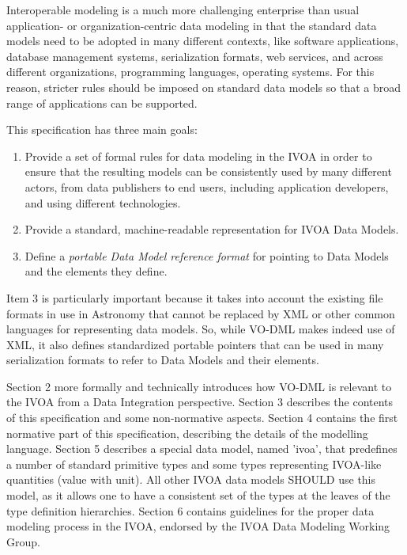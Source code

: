 \documentclass[10pt,a4paper]{ivoa}
\begin{document}
Interoperable modeling is a much more challenging enterprise than usual
application- or organization-centric data modeling in that the standard
data models need to be adopted in many different contexts, like software
applications, database management systems, serialization formats, web
services, and across different organizations, programming languages,
operating systems. For this reason, stricter rules should be imposed on
standard data models so that a broad range of applications can be
supported.

This specification has three main goals:

\begin{enumerate}
\def\labelenumi{\arabic{enumi}.}
\item
  Provide a set of formal rules for data modeling in the IVOA in order
  to ensure that the resulting models can be consistently used by many
  different actors, from data publishers to end users, including
  application developers, and using different technologies.
\item
  Provide a standard, machine-readable representation for IVOA Data
  Models.
\item
  Define a \emph{portable Data Model reference format} for pointing to
  Data Models and the elements they define.
\end{enumerate}

Item 3 is particularly important because it takes into account the
existing file formats in use in Astronomy that cannot be replaced by XML
or other common languages for representing data models. So, while VO-DML
makes indeed use of XML, it also defines standardized portable pointers
that can be used in many serialization formats to refer to Data Models
and their elements.

Section 2 more formally and technically introduces how VO-DML is
relevant to the IVOA from a Data Integration perspective. Section 3
describes the contents of this specification and some non-normative
aspects. Section 4 contains the first normative part of this
specification, describing the details of the modelling language. Section
5 describes a special data model, named 'ivoa', that predefines a number
of standard primitive types and some types representing IVOA-like
quantities (value with unit). All other IVOA data models SHOULD use this
model, as it allows one to have a consistent set of the types at the
leaves of the type definition hierarchies. Section 6 contains guidelines
for the proper data modeling process in the IVOA, endorsed by the IVOA
Data Modeling Working Group.
\end{document}
